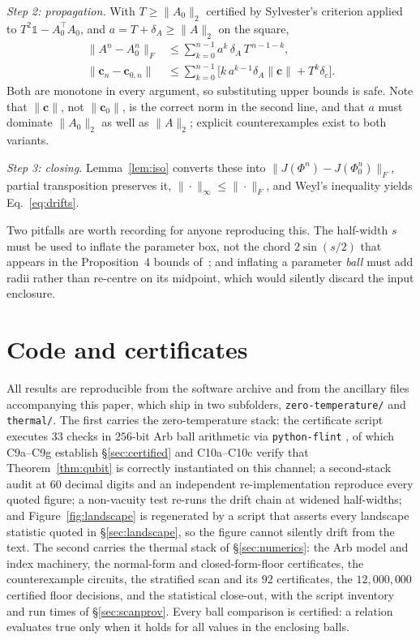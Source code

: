 \documentclass[11pt,a4paper]{article}
\theoremstyle{definition}
\theoremstyle{remark}
\newcommand{\openone}{\mathbb{1}}%
\begin{document}
\emph{Step 2: propagation.} With $T\ge\|A_{0}\|_{2}$ certified by Sylvester's
criterion applied to $T^{2}\openone-A_{0}^{\!\top}A_{0}$, and
$a=T+\delta_{A}\ge\|A\|_{2}$ on the square,
\begin{align}
  \|A^{n}-A_{0}^{n}\|_{F} &\le \textstyle\sum_{k=0}^{n-1}a^{k}\,\delta_{A}\,T^{\,n-1-k},\\
  \|\bm{c}_{n}-\bm{c}_{0,n}\| &\le \textstyle\sum_{k=0}^{n-1}
     \bigl[k\,a^{k-1}\delta_{A}\|\bm{c}\|+T^{k}\delta_{c}\bigr].
\end{align}
Both are monotone in every argument, so substituting upper bounds is safe. Note
that $\|\bm{c}\|$, not $\|\bm{c}_{0}\|$, is the correct norm in the second
line, and that $a$ must dominate $\|A_{0}\|_{2}$ as well as $\|A\|_{2}$;
explicit counterexamples exist to both variants.

\emph{Step 3: closing.} Lemma~\ref{lem:iso} converts these into
$\|J(\Phi^{n})-J(\Phi_{0}^{n})\|_{F}$, partial transposition preserves it,
$\|\cdot\|_{\infty}\le\|\cdot\|_{F}$, and Weyl's inequality yields
Eq.~\eqref{eq:drifts}.

Two pitfalls are worth recording for anyone reproducing this. The half-width
$s$ must be used to inflate the parameter box, not the chord $2\sin(s/2)$ that
appears in the Proposition~4 bounds of~\cite{PaperI}; and inflating a parameter
\emph{ball} must add radii rather than re-centre on its midpoint, which would
silently discard the input enclosure.

\section{Code and certificates}\label{app:code}

All results are reproducible from the software archive \cite{Software} and
from the ancillary files accompanying this paper, which ship in two
subfolders, \texttt{zero-temperature/} and \texttt{thermal/}. The first
carries the zero-temperature stack: the
certificate script executes $33$ checks in $256$-bit Arb ball arithmetic
\cite{Arb} via \texttt{python-flint} \cite{pythonflint}, of which C9a--C9g
establish \S\ref{sec:certified} and C10a--C10c verify that
Theorem~\ref{thm:qubit} is correctly instantiated on this channel; a
second-stack audit at $60$ decimal digits and an independent
re-implementation reproduce every quoted figure; a non-vacuity test re-runs
the drift chain at widened half-widths; and Figure~\ref{fig:landscape} is
regenerated by a script that asserts every landscape statistic quoted in
\S\ref{sec:landscape}, so the figure cannot silently drift from the text.
The second carries the thermal stack of \S\ref{sec:numerics}: the Arb
model and index machinery, the normal-form and closed-form-floor certificates,
the counterexample circuits, the stratified scan and its $92$ certificates,
the $12{,}000{,}000$ certified floor decisions, and the statistical close-out,
with the script inventory and run times of \S\ref{sec:scanprov}. Every ball
comparison is certified: a relation evaluates true only when it holds for all
values in the enclosing balls.
\end{document}
